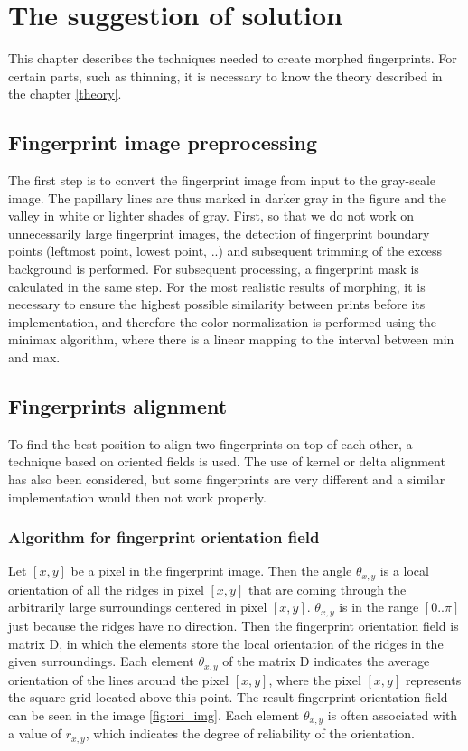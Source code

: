 \label{suggestion}
\chapter{The suggestion of solution}
This chapter describes the techniques needed to create morphed fingerprints. For certain parts, such as thinning, it is necessary to know the theory described in the chapter \ref{theory}.

\section{Fingerprint image preprocessing}\label{preprocessing}
The first step is to convert the fingerprint image from input to the gray-scale image. The papillary lines are thus marked in darker gray in the figure and the valley in white or lighter shades of gray. First, so that we do not work on unnecessarily large fingerprint images, the detection of fingerprint boundary points (leftmost point, lowest point, ..) and subsequent trimming of the excess background is performed. For subsequent processing, a fingerprint mask is calculated in the same step. For the most realistic results of morphing, it is necessary to ensure the highest possible similarity between prints before its implementation, and therefore the color normalization is performed using the minimax algorithm, where there is a linear mapping to the interval between min and max.

\section{Fingerprints alignment}
To find the best position to align two fingerprints on top of each other, a technique based on oriented fields is used. The use of kernel or delta alignment has also been considered, but some fingerprints are very different and a similar implementation would then not work properly.

\subsection{Algorithm for fingerprint orientation field} \label{oricomp}
Let $[x, y]$ be a pixel in the fingerprint image. Then the angle $\theta_{x,y}$ is a local orientation of all the ridges in pixel $[x, y]$ that are coming through the arbitrarily large surroundings centered in pixel $[x, y]$. $\theta_{x,y}$ is in the range $[0..\pi]$ just because the ridges have no direction. Then the fingerprint orientation field is matrix D, in which the elements store the local orientation of the ridges in the given surroundings. Each element $ \theta_{x, y} $ of the matrix D indicates the average orientation of the lines around the pixel $[x, y]$, where the pixel $[x, y]$ represents the square grid located above this point. The result fingerprint orientation field can be seen in the image \ref{fig:ori_img}. Each element $ \theta_{x, y} $ is often associated with a value of $ r_{x, y} $, which indicates the degree of reliability of the orientation.\cite{ori}

